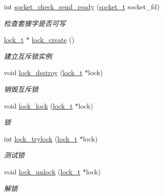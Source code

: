 \begin{DoxyCompactItemize}
int \hyperlink{a00073_a8afd26cc26824e35f1ec942d2c367c2b_a8afd26cc26824e35f1ec942d2c367c2b}{socket\+\_\+check\+\_\+send\+\_\+ready} (\hyperlink{a00047_a0d9e0afbf02fb6ed6c5b1415dce51b05_a0d9e0afbf02fb6ed6c5b1415dce51b05}{socket\+\_\+t} socket\+\_\+fd)
\begin{DoxyCompactList}\small\item\em 检查套接字是否可写 \end{DoxyCompactList}\item 
\hyperlink{a00047_ad3e00e0eb0c79dfd77ff2ff833f49c7d_ad3e00e0eb0c79dfd77ff2ff833f49c7d}{lock\+\_\+t} $\ast$ \hyperlink{a00073_a0e47279c8c752d22446932673be52e38_a0e47279c8c752d22446932673be52e38}{lock\+\_\+create} ()
\begin{DoxyCompactList}\small\item\em 建立互斥锁实例 \end{DoxyCompactList}\item 
void \hyperlink{a00073_aba61c8c4b8ee5ec7e337ed950d680702_aba61c8c4b8ee5ec7e337ed950d680702}{lock\+\_\+destroy} (\hyperlink{a00047_ad3e00e0eb0c79dfd77ff2ff833f49c7d_ad3e00e0eb0c79dfd77ff2ff833f49c7d}{lock\+\_\+t} $\ast$lock)
\begin{DoxyCompactList}\small\item\em 销毁互斥锁 \end{DoxyCompactList}\item 
void \hyperlink{a00073_ad8e04f3d702d3f15868c064947d396b3_ad8e04f3d702d3f15868c064947d396b3}{lock\+\_\+lock} (\hyperlink{a00047_ad3e00e0eb0c79dfd77ff2ff833f49c7d_ad3e00e0eb0c79dfd77ff2ff833f49c7d}{lock\+\_\+t} $\ast$lock)
\begin{DoxyCompactList}\small\item\em 锁 \end{DoxyCompactList}\item 
int \hyperlink{a00073_a2caa15f5d1698c623c1861bd02184d0e_a2caa15f5d1698c623c1861bd02184d0e}{lock\+\_\+trylock} (\hyperlink{a00047_ad3e00e0eb0c79dfd77ff2ff833f49c7d_ad3e00e0eb0c79dfd77ff2ff833f49c7d}{lock\+\_\+t} $\ast$lock)
\begin{DoxyCompactList}\small\item\em 测试锁 \end{DoxyCompactList}\item 
void \hyperlink{a00073_a99cf1d42527f5715b798064281e918ed_a99cf1d42527f5715b798064281e918ed}{lock\+\_\+unlock} (\hyperlink{a00047_ad3e00e0eb0c79dfd77ff2ff833f49c7d_ad3e00e0eb0c79dfd77ff2ff833f49c7d}{lock\+\_\+t} $\ast$lock)
\begin{DoxyCompactList}\small\item\em 解锁 \end{DoxyCompactList}\item 

\end{DoxyCompactItemize}
